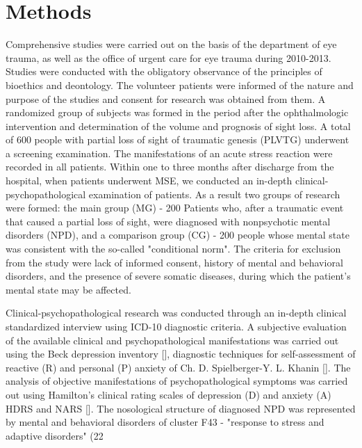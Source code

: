 \documentclass[twocolumn]{article}
\begin{document}
\section {Methods}
\par Comprehensive studies were carried out on the basis of the department of eye trauma, as well as the office of urgent care for eye trauma during 2010-2013. Studies were conducted with the obligatory observance of the principles of bioethics and deontology. The volunteer patients were informed of the nature and purpose of the studies and consent for research was obtained from them. A randomized group of subjects was formed in the period after the ophthalmologic intervention and determination of the volume and prognosis of sight loss. A total of 600 people with partial loss of sight of traumatic genesis (PLVTG) underwent a screening examination. The manifestations of an acute stress reaction were recorded in all patients. Within one to three months after discharge from the hospital, when patients underwent MSE, we conducted an in-depth clinical-psychopathological examination of patients. As a result two groups of research were formed: the main group (MG) - 200 Patients who, after a traumatic event that caused a partial loss of sight, were diagnosed with nonpsychotic mental disorders (NPD), and a comparison group (CG) - 200 people whose mental state was consistent with the so-called "conditional norm". The criteria for exclusion from the study were lack of informed consent, history of mental and behavioral disorders, and the presence of severe somatic diseases, during which the patient's mental state may be affected.
\par Clinical-psychopathological research was conducted through an in-depth clinical standardized interview using ICD-10 diagnostic criteria. A subjective evaluation of the available clinical and psychopathological manifestations was carried out using the Beck depression inventory [\cite{bib9}], diagnostic techniques for self-assessment of reactive (R) and personal (P) anxiety of Ch. D. Spielberger-Y. L. Khanin [\cite{bib10}]. The analysis of objective manifestations of psychopathological symptoms was carried out using Hamilton’s clinical rating scales of depression (D) and anxiety (A) HDRS and NARS [\cite{bib11}]. The nosological structure of diagnosed NPD was represented by mental and behavioral disorders of cluster F43 - "response to stress and adaptive disorders" (22%
\end{document}
